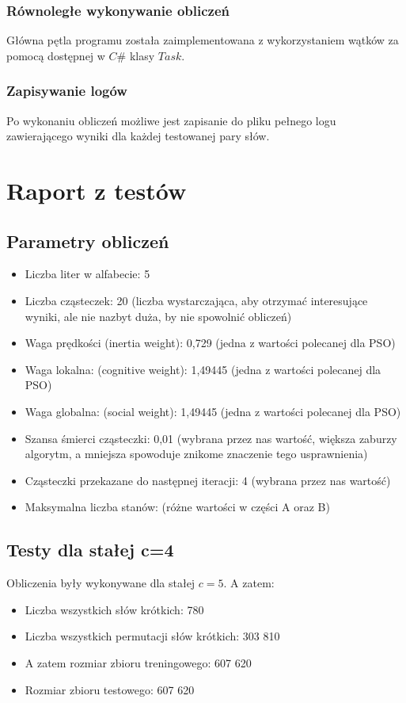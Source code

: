 \documentclass{../llncs_template_final/llncs}
\begin{document}
\subsubsection{Równoległe wykonywanie obliczeń}
Główna pętla programu została zaimplementowana z wykorzystaniem wątków za pomocą dostępnej w $C\#$ klasy $Task$.

\subsubsection{Zapisywanie logów}
Po wykonaniu obliczeń możliwe jest zapisanie do pliku pełnego logu zawierającego wyniki dla każdej testowanej pary słów.

\newpage

\section{Raport z testów}

\subsection{Parametry obliczeń}

\begin{itemize}
\item Liczba liter w alfabecie: 5
\item Liczba cząsteczek: 20 (liczba wystarczająca, aby otrzymać interesujące wyniki, ale nie nazbyt duża, by nie spowolnić obliczeń)
\item Waga prędkości (inertia weight): 0,729 (jedna z wartości polecanej dla PSO)
\item Waga lokalna: (cognitive weight): 1,49445 (jedna z wartości polecanej dla PSO)
\item Waga globalna: (social weight): 1,49445	(jedna z wartości polecanej dla PSO)
\item Szansa śmierci cząsteczki: 0,01 (wybrana przez nas wartość, większa zaburzy algorytm, a mniejsza spowoduje znikome znaczenie tego usprawnienia)
\item Cząsteczki przekazane do następnej iteracji: 4 (wybrana przez nas wartość)
\item Maksymalna liczba stanów: (różne wartości w części A oraz B)
\end{itemize}

\subsection{Testy dla stałej c=4}
Obliczenia były wykonywane dla stałej $c = 5$. A zatem:
\begin{itemize}
\item Liczba wszystkich słów krótkich: 780
\item Liczba wszystkich permutacji słów krótkich: 303 810
\item A zatem rozmiar zbioru treningowego: 607 620
\item Rozmiar zbioru testowego: 607 620
\end{itemize}
\end{document}
